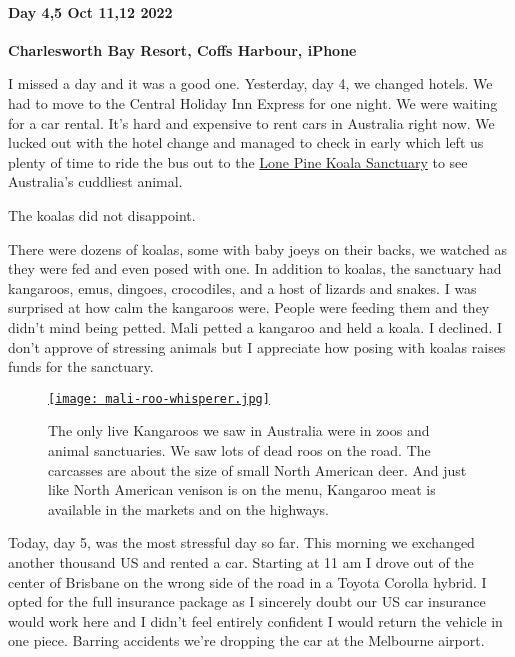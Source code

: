 \hypertarget{day-45-oct-1112-2022}{%
\paragraph{\texorpdfstring{\textbf{Day 4,5 Oct 11,12
2022}}{Day 4,5 Oct 11,12 2022}}\label{day-45-oct-1112-2022}}

\textbf{Charlesworth Bay Resort, Coffs Harbour, iPhone}

I missed a day and it was a good one. Yesterday, day 4, we changed
hotels. We had to move to the Central Holiday Inn Express for one night.
We were waiting for a car rental. It's hard and expensive to rent cars
in Australia right now. We lucked out with the hotel change and managed
to check in early which left us plenty of time to ride the bus out to
the \href{https://lonepinekoalasanctuary.com/}{Lone Pine Koala
Sanctuary} to see Australia's cuddliest animal.

The koalas did not disappoint.

There were dozens of koalas, some with baby joeys on their backs, we
watched as they were fed and even posed with one. In addition to koalas,
the sanctuary had kangaroos, emus, dingoes, crocodiles, and a host of
lizards and snakes. I was surprised at how calm the kangaroos were.
People were feeding them and they didn't mind being petted. Mali petted
a kangaroo and held a koala. I declined. I don't approve of stressing
animals but I appreciate how posing with koalas raises funds for the
sanctuary.

\captionsetup[figure]{labelformat=empty}
\begin{SCfigure}
\centering
\href{https://conceptcontrol.smugmug.com/Trips/Overseas/Australia-New-Zealand-2022/i-FdKCt59/A}{\texttt{[image: mali-roo-whisperer.jpg]}}
\caption[The only live Kangaroos we saw were in zoos]{The only live Kangaroos we saw in Australia were in zoos and
animal sanctuaries. We saw lots of dead roos on the road. The carcasses
are about the size of small North American deer. And just like North
American venison is on the menu, Kangaroo meat is available in the
markets and on the highways.}
\label{fig:7548x2}
\end{SCfigure}

Today, day 5, was the most stressful day so far. This morning we
exchanged another thousand US and rented a car. Starting at 11 am I
drove out of the center of Brisbane on the wrong side of the road in a
Toyota Corolla hybrid. I opted for the full insurance package as I
sincerely doubt our US car insurance would work here and I didn't feel
entirely confident I would return the vehicle in one piece. Barring
accidents we're dropping the car at the Melbourne airport.


